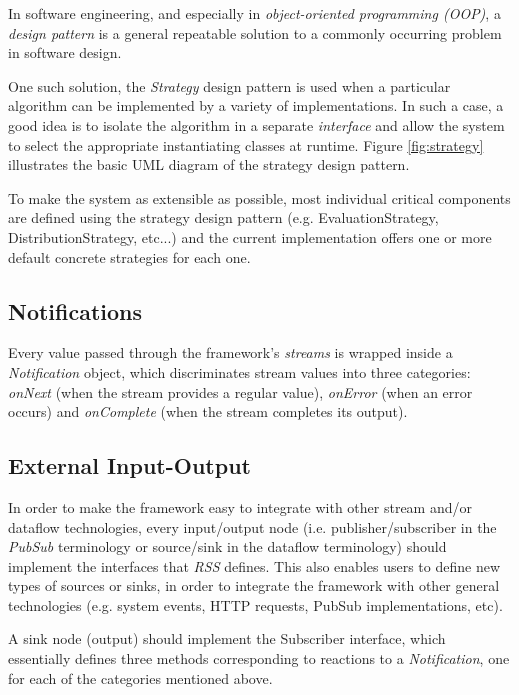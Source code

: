 \documentclass[sigplan,review,anonymous]{acmart}\settopmatter{printfolios=true,printacmref=false}
\begin{document}
In software engineering, and especially in \textit{object-oriented programming (OOP)}, a \textit{design pattern} is a general repeatable solution to a commonly occurring problem in software design\cite{design}.

One such solution, the \textit{Strategy} design pattern is used when a particular algorithm can be implemented by a variety of implementations. In such a case, a good idea is to isolate the algorithm in a separate \textit{interface} and allow the system to select the appropriate instantiating classes at runtime. Figure \ref{fig:strategy} illustrates the basic UML diagram of the strategy design pattern.

To make the system as extensible as possible, most individual critical components are defined using the strategy design pattern (e.g. EvaluationStrategy, DistributionStrategy, etc...) and the current implementation offers one or more default concrete strategies for each one.


\subsection{Notifications}
Every value passed through the framework's \textit{streams} is wrapped inside a \textit{Notification} object, which discriminates stream values into three categories: \textit{onNext} (when the stream provides a regular value), \textit{onError} (when an error occurs) and \textit{onComplete} (when the stream completes its output).

\subsection{External Input-Output} \label{external}
In order to make the framework easy to integrate with other stream and/or dataflow technologies, every input/output node (i.e. publisher/subscriber in the \textit{PubSub} terminology or source/sink in the dataflow terminology) should implement the interfaces that \textit{RSS} defines. This also enables users to define new types of sources or sinks, in order to integrate the framework with other general technologies (e.g. system events, HTTP requests, PubSub implementations, etc).

A sink node (output) should implement the Subscriber interface, which essentially defines three methods corresponding to reactions to a \textit{Notification}, one for each of the categories mentioned above.
\end{document}
